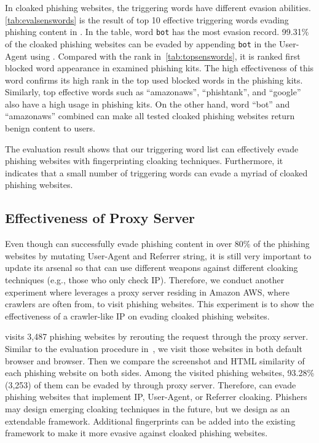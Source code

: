 \evalsenswords

In \senstotalphishing cloaked phishing websites, the triggering words have different evasion abilities.
\autoref{tab:evalsenswords} is the result of top 10 effective triggering words evading phishing content in \spartacus.
In the table, word \texttt{bot} has the most evasion record.
99.31\% of the cloaked phishing websites can be evaded by appending \texttt{bot} in the User-Agent using \spartacus.
Compared with the rank in~\autoref{tab:topsenswords}, it is ranked first blocked word appearance in examined phishing kits.
The high effectiveness of this word confirms its high rank in the top used blocked words in the phishing kits.
Similarly, top effective words such as ``amazonaws'', ``phishtank'', and ``google'' also have a high usage in phishing kits.
On the other hand, word ``bot'' and ``amazonaws'' combined can make all tested cloaked phishing websites return benign content to users.

The evaluation result shows that our triggering word list can effectively evade phishing websites with fingerprinting cloaking techniques.
Furthermore, it indicates that a small number of triggering words can evade a myriad of cloaked phishing websites.


\subsection{Effectiveness of Proxy Server}

Even though \spartacus can successfully evade phishing content in over 80\% of the phishing websites by mutating User-Agent and Referrer string, 
it is still very important to update its arsenal so that \spartacus can use different weapons against different cloaking techniques (e.g., those who only check IP). 
Therefore, we conduct another experiment where \spartacus leverages a proxy server residing in Amazon AWS, where crawlers are often from, to visit phishing websites.
This experiment is to show the effectiveness of a crawler-like IP on evading cloaked phishing websites.

\newcommand{\proxytotalphishing}{3,487\xspace}
\newcommand{\proxyevadephishing}{3,253\xspace}
\newcommand{\proxyphishingperc}{93.28\%\xspace}

\spartacus visits \proxytotalphishing phishing websites by rerouting the request through the proxy server.
Similar to the evaluation procedure in~,
we visit those websites in both default browser and \spartacus browser.
Then we compare the screenshot and HTML similarity of each phishing website on both sides.
Among the visited phishing websites, \proxyphishingperc (\proxyevadephishing) of them can be evaded by \spartacus through proxy server.
Therefore, \spartacus can evade phishing websites that implement IP, User-Agent, or Referrer cloaking.
Phishers may design emerging cloaking techniques in the future, but we design \spartacus as an extendable framework.
Additional fingerprints can be added into the existing framework to make it more evasive against cloaked phishing websites.


